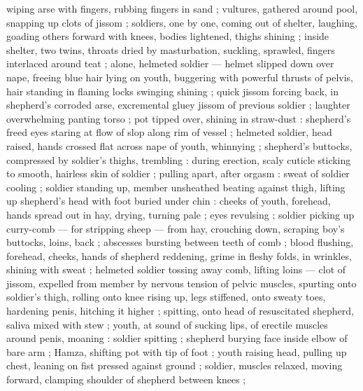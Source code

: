 wiping arse with fingers, rubbing fingers in sand ; vultures, gathered around pool, snapping up clots of jissom ; soldiers, one by one, coming out of shelter, laughing, goading others forward with knees, bodies lightened, thighs shining ; inside shelter, two twins, throats dried by masturbation, suckling, sprawled, fingers interlaced around teat ; alone, helmeted soldier --- helmet slipped down over nape, freeing blue hair {\dashcom} lying on youth, buggering with powerful thrusts of pelvis, hair standing in flaming locks swinging shining ; quick jissom forcing back, in shepherd's corroded arse, excremental gluey jissom of previous soldier ; laughter overwhelming panting torso ; pot tipped over, shining in straw-dust : shepherd's freed eyes staring at flow of slop along rim of vessel ; helmeted soldier, head raised, hands crossed flat across nape of youth, whinnying ; shepherd's buttocks, compressed by soldier's thighs, trembling : during erection, scaly cuticle sticking to smooth, hairless skin of soldier ; pulling apart, after orgasm : sweat of soldier cooling ; soldier standing up, member unsheathed beating against thigh, lifting up shepherd's head with foot buried under chin : cheeks of youth, forehead, hands spread out in hay, drying, turning pale ; eyes revulsing ; soldier picking up curry-comb --- for stripping sheep --- from hay, crouching down, scraping boy's buttocks, loins, back ; abscesses bursting between teeth of comb ; blood flushing, forehead, cheeks, hands of shepherd reddening, grime in fleshy folds, in wrinkles, shining with sweat ; helmeted soldier tossing away comb, lifting loins --- clot of jissom, expelled from member by nervous tension of pelvic muscles, spurting onto soldier's thigh, rolling onto knee {\dashcom} rising up, legs stiffened, onto sweaty toes, hardening penis, hitching it higher ; spitting, onto head of resuscitated shepherd, saliva mixed with stew ; youth, at sound of sucking lips, of erectile muscles around penis, moaning : soldier spitting ; shepherd burying face inside elbow of bare arm ; Hamza, shifting pot with tip of foot ; youth raising head, pulling up chest, leaning on fist pressed against ground ; soldier, muscles relaxed, moving forward, clamping shoulder of shepherd between knees ;
